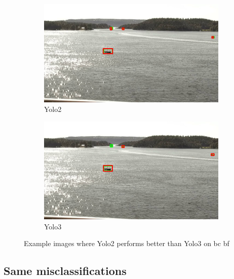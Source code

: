 \begin{figure}[h!]
\begin{subfigure}{.5\textwidth}
  \centering
  \includegraphics[width=0.9\linewidth]{results/case_buildings/yolo23/2better/yolo2/selected_08_11_frame0530.jpg}
  \caption{Yolo2}
\end{subfigure}%
\begin{subfigure}{.5\textwidth}
  \centering
  \includegraphics[width=.9\linewidth]{results/case_buildings/yolo23/2better/yolo3/selected_08_11_frame0530.jpg}
  \caption{Yolo3}
\end{subfigure}
\caption{Example images where Yolo2 performs better than Yolo3 on bc bf}
\label{img:yolo2_better}

\end{figure}

\newpage

\subsection{Same misclassifications}
\label{sec:same_mistake}

